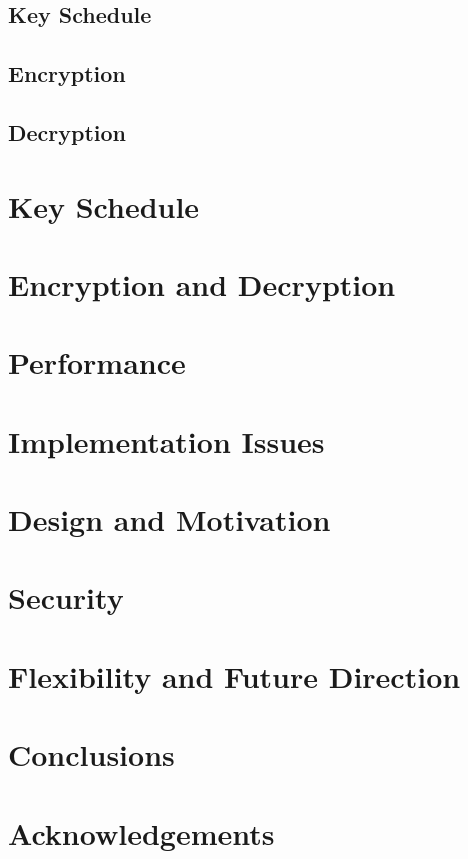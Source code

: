 \documentclass{article}
\begin{document}
\subsection{Key Schedule}

\subsection{Encryption}

\subsection{Decryption}

\section{Key Schedule}

\section{Encryption and Decryption}

\section{Performance}

\section{Implementation Issues}

\section{Design and Motivation}

\section{Security}

\section{Flexibility and Future Direction}

\section{Conclusions}

\section{Acknowledgements}
\end{document}
